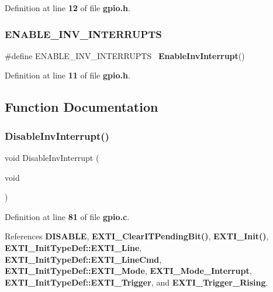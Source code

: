 Definition at line \textbf{ 12} of file \textbf{ gpio.\+h}.

\mbox{\label{gpio_8h_a4913b8663c856264a9f5250effacbeec}} 
\subsubsection{E\+N\+A\+B\+L\+E\+\_\+\+I\+N\+V\+\_\+\+I\+N\+T\+E\+R\+R\+U\+P\+TS}
{\footnotesize\ttfamily \#define E\+N\+A\+B\+L\+E\+\_\+\+I\+N\+V\+\_\+\+I\+N\+T\+E\+R\+R\+U\+P\+TS~\textbf{ Enable\+Inv\+Interrupt}()}



Definition at line \textbf{ 11} of file \textbf{ gpio.\+h}.



\subsection{Function Documentation}
\mbox{\label{gpio_8h_aa4a445d404267e03cd1d6b354472cd19}} 
\subsubsection{Disable\+Inv\+Interrupt()}
{\footnotesize\ttfamily void Disable\+Inv\+Interrupt (\begin{DoxyParamCaption}\item[{void}]{ }\end{DoxyParamCaption})}



Definition at line \textbf{ 81} of file \textbf{ gpio.\+c}.



References \textbf{ D\+I\+S\+A\+B\+LE}, \textbf{ E\+X\+T\+I\+\_\+\+Clear\+I\+T\+Pending\+Bit()}, \textbf{ E\+X\+T\+I\+\_\+\+Init()}, \textbf{ E\+X\+T\+I\+\_\+\+Init\+Type\+Def\+::\+E\+X\+T\+I\+\_\+\+Line}, \textbf{ E\+X\+T\+I\+\_\+\+Init\+Type\+Def\+::\+E\+X\+T\+I\+\_\+\+Line\+Cmd}, \textbf{ E\+X\+T\+I\+\_\+\+Init\+Type\+Def\+::\+E\+X\+T\+I\+\_\+\+Mode}, \textbf{ E\+X\+T\+I\+\_\+\+Mode\+\_\+\+Interrupt}, \textbf{ E\+X\+T\+I\+\_\+\+Init\+Type\+Def\+::\+E\+X\+T\+I\+\_\+\+Trigger}, and \textbf{ E\+X\+T\+I\+\_\+\+Trigger\+\_\+\+Rising}.


